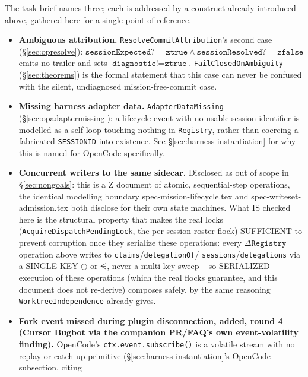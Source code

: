 \documentclass[a4paper,10pt,fleqn]{article}
\newcommand{\field}[1]{\texttt{#1}}
\begin{document}
The task brief names three; each is addressed by a construct already
introduced above, gathered here for a single point of reference.

\begin{itemize}
  \item \textbf{Ambiguous attribution.}
    \field{ResolveCommitAttribution}'s second case
    (\S\ref{sec:opresolve}): $\field{sessionExpected?} = \field{ztrue} \land
    \field{sessionResolved?} = \field{zfalse}$ emits no trailer and sets
    $\field{diagnostic!} = \field{ztrue}$. \field{FailClosedOnAmbiguity}
    (\S\ref{sec:theorems}) is the formal statement that this case can
    never be confused with the silent, undiagnosed mission-free-commit
    case.
  \item \textbf{Missing harness adapter data.} \field{AdapterDataMissing}
    (\S\ref{sec:opadaptermissing}): a lifecycle event with no usable
    session identifier is modelled as a self-loop touching nothing in
    \field{Registry}, rather than coercing a fabricated
    \field{SESSIONID} into existence. See
    \S\ref{sec:harness-instantiation} for why this is named for
    OpenCode specifically.
  \item \textbf{Concurrent writers to the same sidecar.}
  \label{sec:failure-concurrent}
    Disclosed as out of scope in \S\ref{sec:nongoals}: this is a Z
    document of atomic, sequential-step operations, the identical
    modelling boundary spec-mission-lifecycle.tex and
    spec-writeset-admission.tex both disclose for their own state
    machines. What IS checked here is the structural property that
    makes the real locks (\field{AcquireDispatchPendingLock}, the
    per-session roster flock) SUFFICIENT to prevent corruption once
    they serialize these operations: every $\Delta \field{Registry}$
    operation above writes to \field{claims}/\field{delegationOf}/
    \field{sessions}/\field{delegations} via a SINGLE-KEY $\oplus$
    or $\ndres$, never a multi-key sweep -- so SERIALIZED
    execution of these operations (which the real flocks guarantee, and
    this document does not re-derive) composes safely, by the same
    reasoning \field{WorktreeIndependence} already gives.
  \item \textbf{Fork event missed during plugin disconnection,
    \textbf{added, round 4 (Cursor Bugbot via the companion PR/FAQ's
    own event-volatility finding).}} OpenCode's \field{ctx.event.subscribe()}
    is a volatile stream with no replay or catch-up primitive
    (\S\ref{sec:harness-instantiation}'s OpenCode subsection, citing

\end{itemize}
\end{document}
